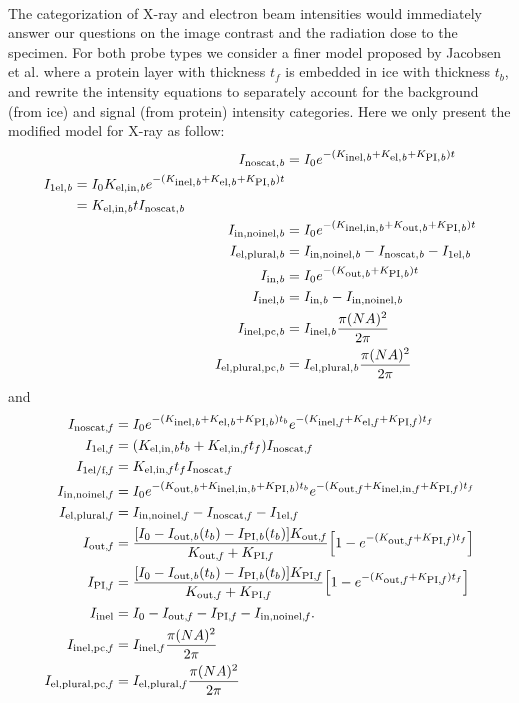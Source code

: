 \documentclass[]{article}
\newcommand\nt{\textup{\scriptsize{0}}}
\newcommand\inel{\textup{\scriptsize{inel}}}
\newcommand\elb{\textup{\scriptsize{el,\textit b}}}
\newcommand\inelb{\textup{\scriptsize{inel,\textit b}}}
\newcommand\elinb{\textup{\scriptsize{el,in,\textit b}}}
\newcommand\inelinb{\textup{\scriptsize{inel,in,\textit b}}}
\newcommand\outb{\textup{\scriptsize{out,\textit b}}}
\newcommand\PIb{\textup{\scriptsize{PI,\textit b}}}
\newcommand\noscatb{\textup{\scriptsize{noscat,\textit b}}}
\newcommand\selb{\textup{\scriptsize{1el,\textit b}}}
\newcommand\elplb{\textup{\scriptsize{el,plural,\textit b}}}
\newcommand\innoinelb{\textup{\scriptsize{in,noinel,\textit b}}}
\newcommand\inelpcb{\textup{\scriptsize{inel,pc,\textit b}}}
\newcommand\elplpcb{\textup{\scriptsize{el,plural,pc,\textit b}}}
\newcommand\inb{\textup{\scriptsize{in,\textit b}}}
\newcommand\elf{\textup{\scriptsize{el,\textit f}}}
\newcommand\inelf{\textup{\scriptsize{inel,\textit f}}}
\newcommand\elinf{\textup{\scriptsize{el,in,\textit f}}}
\newcommand\inelinf{\textup{\scriptsize{inel,in,\textit f}}}
\newcommand\outf{\textup{\scriptsize{out,\textit f}}}
\newcommand\PIf{\textup{\scriptsize{PI,\textit f}}}
\newcommand\noscatf{\textup{\scriptsize{noscat,\textit f}}}
\newcommand\self{\textup{\scriptsize{1el,\textit f}}}
\newcommand\selff{\textup{\scriptsize{1el/f,\textit f}}}
\newcommand\elplf{\textup{\scriptsize{el,plural,\textit f}}}
\newcommand\innoinelf{\textup{\scriptsize{in,noinel,\textit f}}}
\newcommand\inelpcf{\textup{\scriptsize{inel,pc,\textit f}}}
\newcommand\elplpcf{\textup{\scriptsize{el,plural,pc,\textit f}}}
\begin{document}
\paragraph{} The categorization of X-ray and electron beam intensities would immediately answer our questions on the image contrast and the radiation dose to the specimen. For both probe types we consider a finer model proposed by Jacobsen et al. \cite{Jacobsen:1998vj} where a protein layer with thickness $t_f$ is embedded in ice with thickness $t_b$, and rewrite the intensity equations to separately account for the background (from ice) and signal (from protein) intensity categories. Here we only present the modified model for X-ray as follow:
\begin{align}
I_{\noscatb} &= I_{\nt}e^{-(K_{\inelb}+K_{\elb}+K_{\PIb})t}
\label{xb1} \\
\begin{split}
\label{xb2}
I_{\selb} &= I_{\nt}K_{\elinb}e^{-(K_{\inelb}+K_{\elb}+K_{\PIb})t} \\ 
	&= K_{\elinb}t I_{\noscatb}
\end{split} \\
I_{\innoinelb} &= I_{\nt}e^{-(K_{\inelinb}+K_{\outb}+K_{\PIb})t}
\label{xb3} \\
I_{\elplb} &= I_{\innoinelb} - I_{\noscatb} - I_{\selb}
\label{xb4} \\
I_{\inb} &= I_{\nt}e^{-(K_{\outb}+K_{\PIb})t} 
\label{xb5} \\
I_{\inelb} &= I_{\inb} - I_{\innoinelb}
\label{xb7} \\
I_{\inelpcb} &= I_{\inelb} \frac{\pi(NA)^2}{2\pi} \\
I_{\elplpcb} &= I_{\elplb} \frac{\pi(NA)^2}{2\pi}
\end{align} %
and
\begin{align}
I_{\noscatf} &= I_{\nt}e^{-(K_{\inelb}+K_{\elb}+K_{\PIb})t_b}e^{-(K_{\inelf}+K_{\elf}+K_{\PIf})t_f}
\label{xf1} \\
I_{\self} &= (K_{\elinb}t_b + K_{\elinf}t_f) I_{\noscatf}
\label{xf2} \\
I_{\selff} &= K_{\elinf}t_f I_{\noscatf}
\label{xf2.5} \\
I_{\innoinelf} &= I_{\nt} e^{-(K_{\outb}+K_{\inelinb}+K_{\PIb})t_b} e^{-(K_{\outf}+K_{\inelinf}+K_{\PIf})t_f}
\label{xf3} \\
I_{\elplf} &= I_{\innoinelf} - I_{\noscatf} - I_{\self}
\label{xf4} \\
I_{\outf} &= \frac{[I_{\nt}-I_{\outb}(t_b)-I_{\PIb}(t_b)]K_{\outf}}{K_{\outf}+K_{\PIf}} \Big[1 - e^{-(K_{\outf}+K_{\PIf})t_f}\Big]
\label{xf5} \\
I_{\PIf} &= \frac{[I_{\nt}-I_{\outb}(t_b)-I_{\PIb}(t_b)]K_{\PIf}}{K_{\outf}+K_{\PIf}} \Big[1 - e^{-(K_{\outf}+K_{\PIf})t_f}\Big]
\label{xf6} \\
I_{\inel} &= I_{\nt} - I_{\outf} - I_{\PIf} - I_{\innoinelf}.
\label{xf7} \\
I_{\inelpcf} &= I_{\inelf} \frac{\pi(NA)^2}{2\pi} \\
I_{\elplpcf} &= I_{\elplf} \frac{\pi(NA)^2}{2\pi} 
\end{align} %
\end{document}
